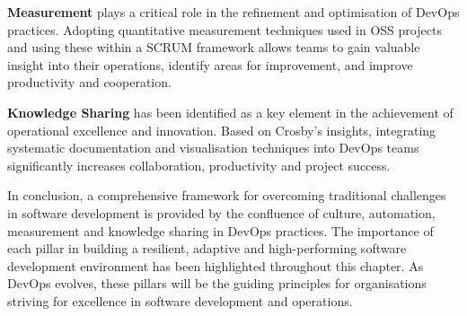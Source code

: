\textbf{Measurement} plays a critical role in the refinement and optimisation of DevOps practices. Adopting quantitative measurement techniques used in OSS projects and using these within a SCRUM framework allows teams to gain valuable insight into their operations, identify areas for improvement, and improve productivity and cooperation.

\textbf{Knowledge Sharing} has been identified as a key element in the achievement of operational excellence and innovation. Based on Crosby's insights, integrating systematic documentation and visualisation techniques into DevOps teams significantly increases collaboration, productivity and project success.

In conclusion, a comprehensive framework for overcoming traditional challenges in software development is provided by the confluence of culture, automation, measurement and knowledge sharing in DevOps practices. The importance of each pillar in building a resilient, adaptive and high-performing software development environment has been highlighted throughout this chapter. As DevOps evolves, these pillars will be the guiding principles for organisations striving for excellence in software development and operations.


